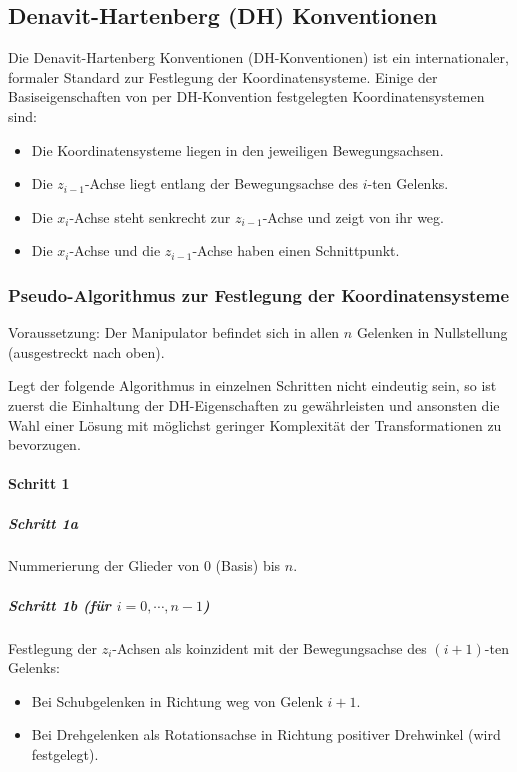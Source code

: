 		\subsection{Denavit-Hartenberg (DH) Konventionen}
			Die Denavit-Hartenberg Konventionen (DH-Konventionen) ist ein internationaler, formaler Standard zur Festlegung der Koordinatensysteme. Einige der Basiseigenschaften von per DH-Konvention festgelegten Koordinatensystemen sind:
			\begin{itemize}
				\item Die Koordinatensysteme liegen in den jeweiligen Bewegungsachsen.
				\item Die \( z_{i - 1} \)-Achse liegt entlang der Bewegungsachse des \(i\)-ten Gelenks.
				\item Die \(x_i\)-Achse steht senkrecht zur \(z_{i - 1}\)-Achse und zeigt von ihr weg.
				\item Die \(x_i\)-Achse und die \(z_{i - 1}\)-Achse haben einen Schnittpunkt.
			\end{itemize}
		
			\subsubsection{Pseudo-Algorithmus zur Festlegung der Koordinatensysteme}
				Voraussetzung: Der Manipulator befindet sich in allen \(n\) Gelenken in Nullstellung (\zB ausgestreckt nach oben).
				
				Legt der folgende Algorithmus in einzelnen Schritten nicht eindeutig sein, so ist zuerst die Einhaltung der DH-Eigenschaften zu gewährleisten und ansonsten die Wahl einer Lösung mit möglichst geringer Komplexität der Transformationen zu bevorzugen.
				
				\paragraph{Schritt 1}
					\subparagraph{Schritt 1a}
					Nummerierung der Glieder von \(0\) (Basis) bis \(n\).
					
					\subparagraph{Schritt 1b (für \( i = 0, \cdots, n - 1 \))}
					Festlegung der \(z_i\)-Achsen als koinzident mit der Bewegungsachse des \( (i + 1) \)-ten Gelenks:
					\begin{itemize}
						\item Bei Schubgelenken in Richtung weg von Gelenk \(i + 1\).
						\item Bei Drehgelenken als Rotationsachse in Richtung positiver Drehwinkel (wird festgelegt).
					\end{itemize}
				
